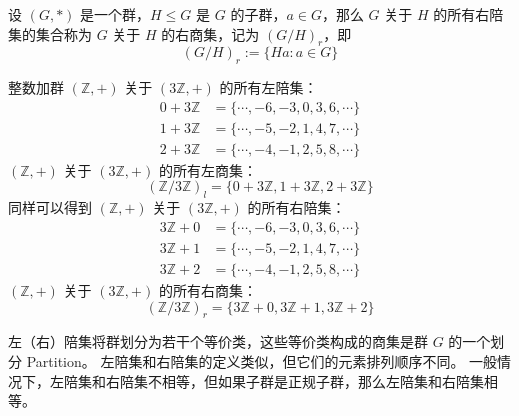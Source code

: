\begin{definition}
    设 $(G, *)$ 是一个群，$H \le G$ 是 $G$ 的子群，$a\in G$，那么 $G$ 关于 $H$ 的所有右陪集的集合称为 $G$ 关于 $H$ 的右商集，记为 $(G/H)_r$，即
    \[
        (G/H)_r := \{Ha:a\in G\}
    \]
\end{definition}

\begin{example}
    整数加群 $(\mathbb{Z}, +)$ 关于 $(3\mathbb{Z},+)$ 的所有左陪集：
    \begin{align*}
        0+3\mathbb{Z} &= \{\cdots,-6,-3,0,3,6,\cdots\}\\
        1+3\mathbb{Z} &= \{\cdots,-5,-2,1,4,7,\cdots\}\\
        2+3\mathbb{Z} &= \{\cdots,-4,-1,2,5,8,\cdots\}
    \end{align*}
    $(\mathbb{Z},+)$ 关于 $(3\mathbb{Z},+)$ 的所有左商集：
    \[
        (\mathbb{Z}/3\mathbb{Z})_l = \{0+3\mathbb{Z}, 1+3\mathbb{Z}, 2+3\mathbb{Z}\}
    \]
    同样可以得到 $(\mathbb{Z},+)$ 关于 $(3\mathbb{Z},+)$ 的所有右陪集：
    \begin{align*}
        3\mathbb{Z}+0 &= \{\cdots,-6,-3,0,3,6,\cdots\}\\
        3\mathbb{Z}+1 &= \{\cdots,-5,-2,1,4,7,\cdots\}\\
        3\mathbb{Z}+2 &= \{\cdots,-4,-1,2,5,8,\cdots\}
    \end{align*}
    $(\mathbb{Z},+)$ 关于 $(3\mathbb{Z},+)$ 的所有右商集：
    \[
        (\mathbb{Z}/3\mathbb{Z})_r = \{3\mathbb{Z}+0, 3\mathbb{Z}+1, 3\mathbb{Z}+2\}
    \]
    \label{ex:cosets_of_Z_mod_3Z}
\end{example}

\begin{note}
    左（右）陪集将群划分为若干个等价类，这些等价类构成的商集是群 $G$ 的一个划分 Partition。
    左陪集和右陪集的定义类似，但它们的元素排列顺序不同。
    一般情况下，左陪集和右陪集不相等，但如果子群是正规子群，那么左陪集和右陪集相等。
\end{note}
\vspace{1em}

